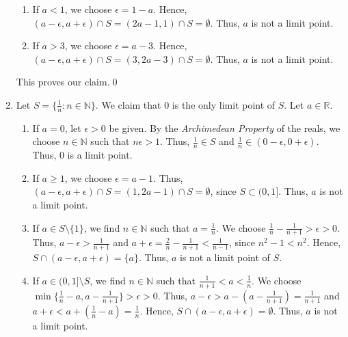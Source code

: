 \documentclass[10pt]{article}
\begin{document}
\begin{enumerate}
\begin{enumerate}
                        \item If $a < 1$, we choose $\epsilon = 1 - a$. Hence, $(a - \epsilon, a + \epsilon) \cap S = 
                        (2a - 1, 1) \cap S = \emptyset$. Thus, $a$ is not a limit point.

                        \item If $a > 3$, we choose $\epsilon = a - 3$. Hence, $(a - \epsilon, a + \epsilon) \cap S =
                        (3, 2a - 3) \cap S = \emptyset$. Thus, $a$ is not a limit point.
                \end{enumerate}
                This proves our claim.\qed

                \item Let $S = \{\frac{1}{n}: n \in \mathbb{N}\}$. We claim that $0$ is the only limit point of $S$.
                Let $a \in \mathbb{R}$.
                \begin{enumerate}
                        \item If $a = 0$, let $\epsilon > 0$ be given. By the \emph{Archimedean Property} of the reals,
                        we choose $n \in \mathbb{N}$ such that $n\epsilon > 1$. Thus, $\frac{1}{n} \in S$ and
                        $\frac{1}{n} \in (0 - \epsilon, 0 + \epsilon)$. Thus, $0$ is a limit point.

                        \item If $a \ge 1$, we choose $\epsilon = a - 1$. Thus, $(a - \epsilon, a + \epsilon) \cap S = 
                        (1, 2a - 1) \cap S = \emptyset$, since $S \subset (0, 1]$. Thus, $a$ is not a limit point.

                        \item If $a \in S\setminus\{1\}$, we find $n \in \mathbb{N}$ such that $a = \frac{1}{n}$. We choose
                        $\frac{1}{n} - \frac{1}{n+1} > \epsilon > 0$. Thus, $a - \epsilon > \frac{1}{n+1}$ and
                        $a + \epsilon = \frac{2}{n} - \frac{1}{n+1} < \frac{1}{n-1}$, since $n^2 - 1 < n^2$.
                        Hence, $S \cap (a - \epsilon, a + \epsilon) = \{a\}$.
                        Thus, $a$ is not a limit point of $S$.

                        \item If $a \in (0, 1]\setminus S$, we find $n \in \mathbb{N}$ such that $\frac{1}{n+1} < a < \frac{1}{n}$.
                        We choose $\min\{\frac{1}{n} - a, a - \frac{1}{n + 1}\} > \epsilon > 0$.
                        Thus, $a - \epsilon > a - (a - \frac{1}{n+1}) = \frac{1}{n+1}$ and $a + \epsilon < a + (\frac{1}{n} - a) = \frac{1}{n}$.
                        Hence, $S \cap (a - \epsilon, a + \epsilon) = \emptyset$. Thus, $a$ is not a limit point.
                        

\end{enumerate}
\end{enumerate}
\end{document}
